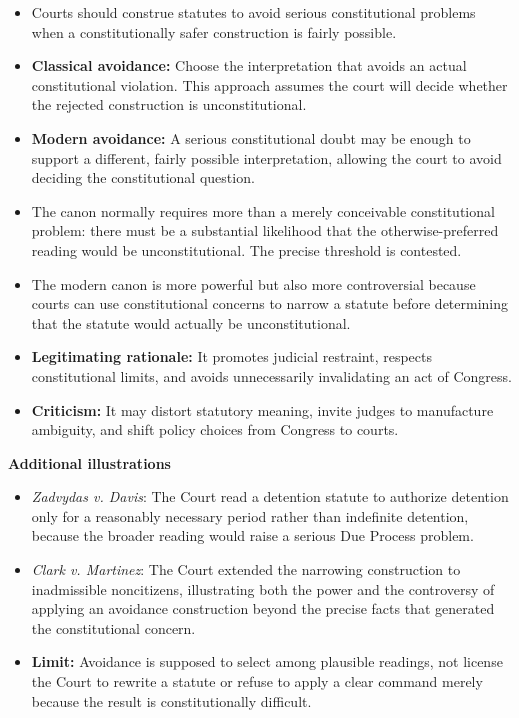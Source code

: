\documentclass[11pt]{tex/lawoutline}
\begin{document}
{
\begin{itemize}
    \item Courts should construe statutes to avoid serious constitutional problems when a constitutionally safer construction is fairly possible.
    \item \textbf{Classical avoidance:} Choose the interpretation that avoids an actual constitutional violation. This approach assumes the court will decide whether the rejected construction is unconstitutional.
    \item \textbf{Modern avoidance:} A serious constitutional doubt may be enough to support a different, fairly possible interpretation, allowing the court to avoid deciding the constitutional question.
    \item The canon normally requires more than a merely conceivable constitutional problem: there must be a substantial likelihood that the otherwise-preferred reading would be unconstitutional. The precise threshold is contested.
    \item The modern canon is more powerful but also more controversial because courts can use constitutional concerns to narrow a statute before determining that the statute would actually be unconstitutional.
    \item \textbf{Legitimating rationale:} It promotes judicial restraint, respects constitutional limits, and avoids unnecessarily invalidating an act of Congress.
    \item \textbf{Criticism:} It may distort statutory meaning, invite judges to manufacture ambiguity, and shift policy choices from Congress to courts.
\end{itemize}
}

\textbf{Additional illustrations}

\begin{itemize}
    \item \textit{Zadvydas v. Davis}: The Court read a detention statute to authorize detention only for a reasonably necessary period rather than indefinite detention, because the broader reading would raise a serious Due Process problem.
    \item \textit{Clark v. Martinez}: The Court extended the narrowing construction to inadmissible noncitizens, illustrating both the power and the controversy of applying an avoidance construction beyond the precise facts that generated the constitutional concern.
    \item \textbf{Limit:} Avoidance is supposed to select among plausible readings, not license the Court to rewrite a statute or refuse to apply a clear command merely because the result is constitutionally difficult.
\end{itemize}
\end{document}

